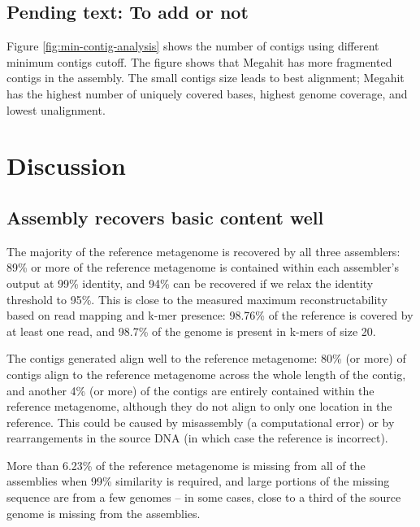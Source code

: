\documentclass[10pt,a4paper,twocolumn]{article}
\begin{document}
\subsection*{Pending text: To add or not}
Figure \ref{fig:min-contig-analysis} shows the number of contigs using different minimum contigs cutoff. 
The figure shows that Megahit \cite{megahit} has more fragmented contigs in the assembly. The small contigs size leads to best alignment; Megahit has the highest number of uniquely covered bases, highest genome coverage, and lowest unalignment. 

\section*{Discussion}
\subsection*{Assembly recovers basic content well}
The majority of the reference metagenome is recovered by all three assemblers: 89\% or more of the reference metagenome is contained within each assembler’s output at 99\% identity, and 94\% can be recovered if we relax the identity threshold to 95\%.  This is close to the measured maximum reconstructability based on read mapping and k-mer presence: 98.76\% of the reference is covered by at least one read, and 98.7\% of the genome is present in k-mers of size 20. %

The contigs generated align well to the reference metagenome: 80\% (or more) of contigs align to the reference metagenome across the whole length of the contig, and another 4\% (or more) of the contigs are entirely contained within the reference metagenome, although they do not align to only one location in the reference. This could be caused by misassembly (a computational error) or by rearrangements in the source DNA (in which case the reference is incorrect).
 
More than 6.23\% of the reference metagenome is missing from all of the assemblies when 99\% similarity is required, and large portions of the missing sequence are from a few genomes -- in some cases, close to a third of the source genome is missing from the assemblies. 
\end{document}
